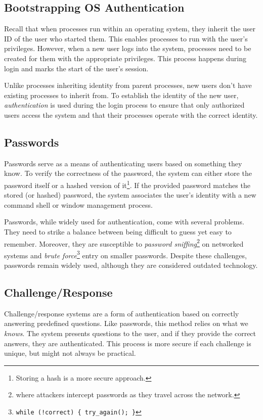 \documentclass{report}
\newcommand{\corollaryBegin}[1]{\begin{tcolorbox}[colback=teal!5!white,colframe=black!75!teal,title={Corollary:
      #1}]}
\newcommand{\corollaryEnd}{\end{tcolorbox}}
\begin{document}
\subsection{Bootstrapping OS Authentication}
Recall that when processes run within an operating system, they inherit the user ID of the user who
started them. This enables processes to run with the user's privileges. However, when a new user
logs into the system, processes need to be created for them with the appropriate privileges. This
process happens during login and marks the start of the user's session.

Unlike processes inheriting identity from parent processes, new users don't have existing processes
to inherit from. To establish the identity of the new user, \textit{authentication} is used during
the login process to ensure that only authorized users access the system and that their processes
operate with the correct identity. 


\subsection{Passwords}
Passwords serve as a means of authenticating users based on something they know. To verify the
correctness of the password, the system can either store the password itself or a hashed version of
it\footnote{Storing a hash is a more secure approach.}. If the provided password matches the stored (or
hashed) password, the system associates the user's identity with a new command shell or window
management process.

\corollaryBegin{Issues}
Passwords, while widely used for authentication, come with several problems. They need to strike a
balance between being difficult to guess yet easy to remember. Moreover, they are susceptible to
\textit{password sniffing}\footnote{where attackers intercept passwords as they travel across the
network.} on networked systems and \textit{brute force}\footnote{\texttt{while (!correct)
  \{ try\_again(); \}}} entry on smaller passwords. Despite these challenges,
passwords remain widely used, although they are considered outdated technology.
\corollaryEnd


\subsection{Challenge/Response}
Challenge/response systems are a form of authentication based on correctly answering predefined
questions. Like passwords, this method relies on what we \textit{knows}. The system presents
questions to the user, and if they provide the correct answers, they are authenticated. This process
is more secure if each challenge is unique, but might not always be practical.
\end{document}
